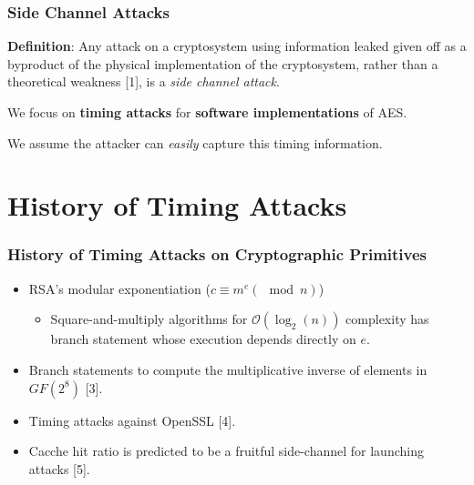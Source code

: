\documentclass[9pt,handout]{beamer}
\begin{document}
\begin{frame}
	\frametitle{Side Channel Attacks}
	\textbf{Definition}: Any attack on a cryptosystem using information leaked given off as a byproduct of the physical implementation of the cryptosystem, rather than a theoretical weakness [1], is a \emph{side channel attack}.

	\bigskip

	We focus on \textbf{timing attacks} for \textbf{software implementations} of AES.

	\bigskip

	We assume the attacker can \emph{easily} capture this timing information.
\end{frame}

\section{History of Timing Attacks}
\begin{frame}
	\frametitle{History of Timing Attacks on Cryptographic Primitives}
	\begin{itemize}
		\item RSA's modular exponentiation ($c \equiv m^e (\mod n)$)
		\begin{itemize}
			\item Square-and-multiply algorithms for $\mathcal{O}(\log_2(n))$ complexity has branch statement whose execution depends directly on $e$.
		\end{itemize}
		\item Branch statements to compute the multiplicative inverse of elements in $GF(2^8)$ [3].
		\item Timing attacks against OpenSSL [4].
		\item Cacche hit ratio is predicted to be a fruitful side-channel for launching attacks [5].
	\end{itemize}
\end{frame}
\end{document}
